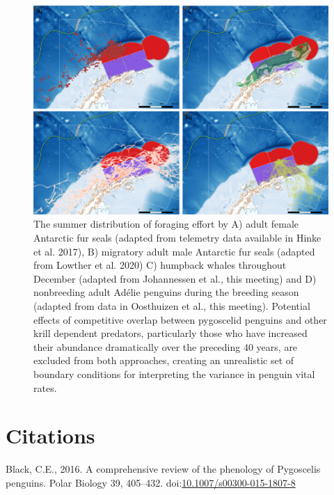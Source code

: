 \documentclass[]{elsarticle} %
\begin{document}
\begin{figure}

\includegraphics[width=1\linewidth]{./Watters EMM figures/Other spp distribution} \hfill{}

\caption{The summer distribution of foraging effort by A) adult female Antarctic fur seals (adapted from telemetry data available in Hinke et al. 2017), B) migratory adult male Antarctic fur seals (adapted from Lowther et al. 2020) C) humpback whales throughout December (adapted from Johannessen et al., this meeting) and D) nonbreeding adult Adélie penguins during the breeding season (adapted from data in Oosthuizen et al., this meeting). Potential effects of competitive overlap between pygoscelid penguins and other krill dependent predators, particularly those who have increased their abundance dramatically over the preceding 40 years, are excluded from both approaches, creating an unrealistic set of boundary conditions for interpreting the variance in penguin vital rates.}\label{fig:Supplementary Figure 2 other species plots}
\end{figure}
\newpage
\scriptsize

\newpage

\hypertarget{citations}{%
\section*{Citations}\label{citations}}

\hypertarget{refs}{}
\leavevmode\hypertarget{ref-Black2016}{}%
Black, C.E., 2016. A comprehensive review of the phenology of Pygoscelis
penguins. Polar Biology 39, 405--432.
doi:\href{https://doi.org/10.1007/s00300-015-1807-8}{10.1007/s00300-015-1807-8}
\end{document}
